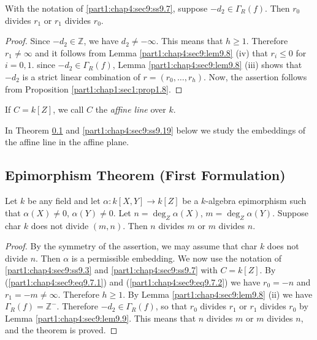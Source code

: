 \begin{lemma}\label{part1:chap4:sec9:lem9.9}
  With the notation of \ref{part1:chap4:sec9:ss9.7}, suppose $-d_2 \in \Gamma_R (f)$. Then $r_0$ divides $r_1$ or $r_1$ divides $r_0$.
\end{lemma}

\begin{proof}
  Since $-d_2\in \mathbb{Z}$, we have $d_2 \neq - \infty$. This means that $h \geq 1$. Therefore $r_1 \neq \infty$ and it follows from Lemma \ref{part1:chap4:sec9:lem9.8} (iv) that $r_i \leq 0$ for $i =0,1$. since $-d_2 \in \Gamma_R (f)$, Lemma \ref{part1:chap4:sec9:lem9.8} (iii) shows that $-d_2$ is a strict linear combination of $r= (r_0, \ldots , r_h)$. Now, the assertion follows from Proposition \ref{part1:chap1:sec1:prop1.8}.
\end{proof}

\begin{defi}\label{part1:chap4:sec9:def9.10}
  If $C= k[Z]$, we call $C$ the {\em affine line} over $k$. 
\end{defi}

In Theorem \ref{part1:chap4:sec9:ss9.11} and \ref{part1:chap4:sec9:ss9.19} below we study the embeddings of the affine line in the affine plane.

\setcounter{subsection}{10}
\subsection{Epimorphism Theorem (First Formulation)}
\label{part1:chap4:sec9:ss9.11}

Let $k$ be any field and let $\alpha : k[X, Y] \to k [Z]$ be a $k$-algebra epimorphism such that $\alpha (X) \neq 0$, $\alpha (Y)\neq 0$. Let $n = \deg_Z \alpha (X)$, $m= \deg_Z \alpha (Y)$. Suppose char $k$ does not divide \gcd $(m, n)$. Then $n$ divides $m$ or $m$ divides $n$.

\begin{proof}
  By the symmetry of the assertion, we may assume that char $k$ does not divide $n$. Then $\alpha$ is a permissible embedding. We now use the notation of \ref{part1:chap4:sec9:ss9.3} and \ref{part1:chap4:sec9:ss9.7} with $C= k[Z]$. By (\ref{part1:chap4:sec9:eq9.7.1}) and (\ref{part1:chap4:sec9:eq9.7.2}) we have $r_0 =- n$ and $r_1=-m \neq \infty$. Therefore $h \geq 1$. By Lemma \ref{part1:chap4:sec9:lem9.8} (ii) we have $\Gamma_R (f) = \mathbb{Z}^-$. Therefore $- d_2 \in \Gamma_R (f)$, so that $r_0$ divides $r_1$ or $r_1$ divides $r_0$ by Lemma \ref{part1:chap4:sec9:lem9.9}. This means that $n$ divides $m$ or $m$ divides $n$, and the theorem is proved.
\end{proof}

